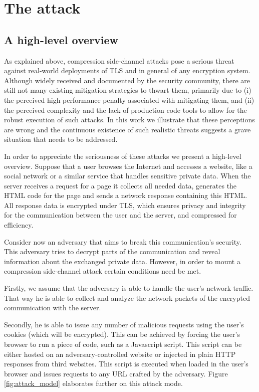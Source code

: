 \section{The attack}\label{sec:attack}

\subsection{A high-level overview}\label{subsec:example}
As explained above, compression side-channel attacks pose a serious threat
against real-world deployments of TLS and in general of any encryption system.
Although widely received and documented by the security community, there are
still not many existing mitigation strategies to thwart them, primarily due to
(i) the perceived high performance penalty associated with mitigating them, and
(ii) the perceived complexity and the lack of production code tools to allow for
the robust execution of such attacks. In this work we illustrate that these
perceptions are wrong and the continuous existence of such realistic threats
suggests a grave situation that needs to be addressed.

In order to appreciate the seriousness of these attacks we present a high-level
overview. Suppose that a user browses the Internet and accesses a website, like
a social network or a similar service that handles sensitive private data. When
the server receives a request for a page it collects all needed data, generates
the HTML code for the page and sends a network response containing this HTML.
All response data is encrypted under TLS, which ensures privacy and integrity
for the communication between the user and the server, and compressed for
efficiency.

Consider now an adversary that aims to break this communication's security.
This adversary tries to decrypt parts of the communication and reveal
information about the exchanged private data. However, in order to mount a
compression side-channel attack certain conditions need be met.

Firstly, we assume that the adversary is able to handle the user's network
traffic. That way he is able to collect and analyze the network packets of the
encrypted communication with the server.

Secondly, he is able to issue any number of malicious requests using the user's
cookies (which will be encrypted). This can be achieved by forcing the user's
browser to run a piece of code, such as a Javascript script. This script can be
either hosted on an adversary-controlled website or injected in plain HTTP
responses from third websites. This script is executed when loaded in the user's
browser and issues requests to any URL crafted by the adversary. Figure
\ref{fig:attack_model} elaborates further on this attack mode.

